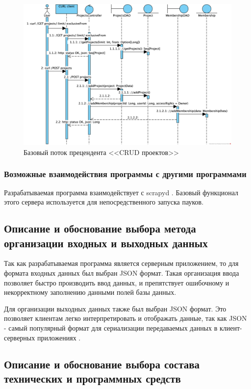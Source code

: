 \documentclass[a4paper,12pt]{article}
\begin{document}
\begin{figure}[H]
		\centering
		\includegraphics[width = \linewidth]{img/BaseFlow-Projects.png}
		\caption{Базовый поток прецендента <<CRUD проектов>>}
		\label{pic:baseflow-projects}
	\end{figure}




	
	
	
	
\clearpage
	\subsubsection{Возможные взаимодействия программы с другими программами}
	
	Разрабатываемая программа взаимодействует с scrapyd \cite{scrapyd}. Базовый функционал этого сервера используется для непосредственного запуска пауков.
	\subsection{Описание и обоснование выбора метода организации входных и выходных данных}

	
	Так как разрабатываемая программа является серверным приложением, то для формата входных данных был выбран JSON формат. Такая организация ввода позволяет быстро производить ввод данных, и препятствует ошибочному и некорректному заполнению данными полей базы данных.
	
	Для организации выходных данных также был выбран JSON формат. Это позволяет клиентам легко интерпретировать и отображать данные, так как JSON - самый популярный формат для сериализации передаваемых данных в клиент-серверных приложениях \cite{json}.
	\subsection{Описание и обоснование выбора состава технических и программных средств}
\end{document}
